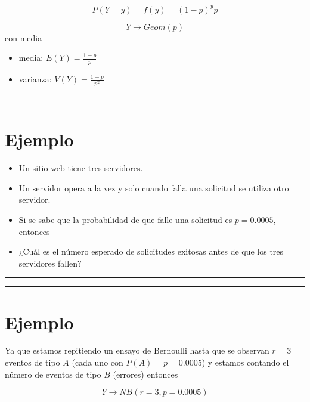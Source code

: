 \documentclass[
]{book}
\begin{document}
\[P(Y=y)=f(y)= (1-p)^yp\]

\[Y\rightarrow Geom(p)\]
con media

\begin{itemize}
\item
  media: \(E(Y)= \frac{1-p}{p}\)
\item
  varianza: \(V(Y)= \frac{1-p}{p^2}\)
\end{itemize}

\begin{center}\rule{0.5\linewidth}{0.5pt}\end{center}

\begin{center}\rule{0.5\linewidth}{0.5pt}\end{center}

\hypertarget{ejemplo-9}{%
\section{Ejemplo}\label{ejemplo-9}}

\begin{itemize}
\item
  Un sitio web tiene tres servidores.
\item
  Un servidor opera a la vez y solo cuando falla una solicitud se utiliza otro servidor.
\item
  Si se sabe que la probabilidad de que falle una solicitud es \(p=0.0005\), entonces
\item
  ¿Cuál es el número esperado de solicitudes exitosas antes de que los tres servidores fallen?
\end{itemize}

\begin{center}\rule{0.5\linewidth}{0.5pt}\end{center}

\begin{center}\rule{0.5\linewidth}{0.5pt}\end{center}

\hypertarget{ejemplo-10}{%
\section{Ejemplo}\label{ejemplo-10}}

Ya que estamos repitiendo un ensayo de Bernoulli hasta que se observan \(r=3\) eventos de tipo \(A\) (cada uno con \(P(A)=p=0.0005\)) y estamos contando el número de eventos de tipo \(B\) (errores) entonces

\[Y \rightarrow NB(r=3, p=0.0005)\]
\end{document}
